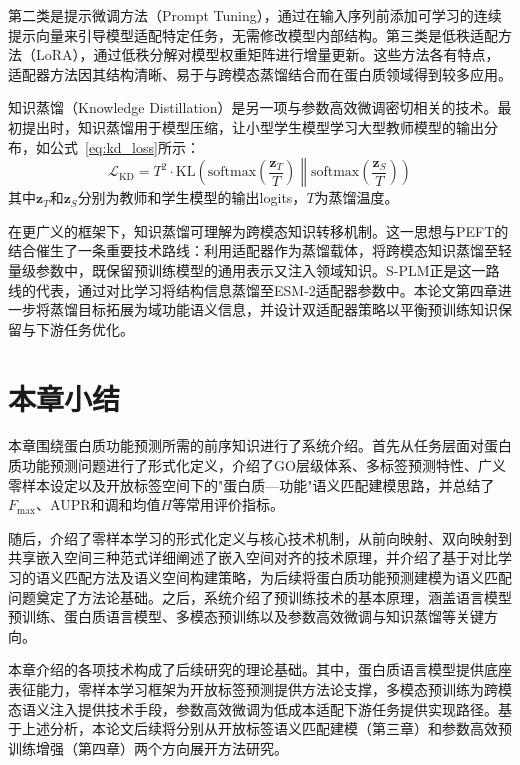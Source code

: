 第二类是提示微调方法（Prompt Tuning），通过在输入序列前添加可学习的连续提示向量来引导模型适配特定任务，无需修改模型内部结构。第三类是低秩适配方法（LoRA）\cite{hu2022lora}，通过低秩分解对模型权重矩阵进行增量更新。这些方法各有特点，适配器方法因其结构清晰、易于与跨模态蒸馏结合而在蛋白质领域得到较多应用。

知识蒸馏（Knowledge Distillation）\cite{hinton2015distilling}是另一项与参数高效微调密切相关的技术。最初提出时，知识蒸馏用于模型压缩，让小型学生模型学习大型教师模型的输出分布，如公式~\eqref{eq:kd_loss}所示：
\begin{equation}
\label{eq:kd_loss}
\mathcal{L}_{\text{KD}} = T^2 \cdot \text{KL}\left(\text{softmax}\left(\frac{\mathbf{z}_T}{T}\right) \middle\| \text{softmax}\left(\frac{\mathbf{z}_S}{T}\right)\right)
\end{equation}
其中$\mathbf{z}_T$和$\mathbf{z}_S$分别为教师和学生模型的输出logits，$T$为蒸馏温度。

在更广义的框架下，知识蒸馏可理解为跨模态知识转移机制。这一思想与PEFT的结合催生了一条重要技术路线：利用适配器作为蒸馏载体，将跨模态知识蒸馏至轻量级参数中，既保留预训练模型的通用表示又注入领域知识。S-PLM\cite{wang2025splm}正是这一路线的代表，通过对比学习将结构信息蒸馏至ESM-2适配器参数中。本论文第四章进一步将蒸馏目标拓展为域功能语义信息，并设计双适配器策略以平衡预训练知识保留与下游任务优化。

\section{本章小结}

本章围绕蛋白质功能预测所需的前序知识进行了系统介绍。首先从任务层面对蛋白质功能预测问题进行了形式化定义，介绍了GO层级体系、多标签预测特性、广义零样本设定以及开放标签空间下的"蛋白质—功能"语义匹配建模思路，并总结了$F_{\max}$、AUPR和调和均值$H$等常用评价指标。

随后，介绍了零样本学习的形式化定义与核心技术机制，从前向映射、双向映射到共享嵌入空间三种范式详细阐述了嵌入空间对齐的技术原理，并介绍了基于对比学习的语义匹配方法及语义空间构建策略，为后续将蛋白质功能预测建模为语义匹配问题奠定了方法论基础。之后，系统介绍了预训练技术的基本原理，涵盖语言模型预训练、蛋白质语言模型、多模态预训练以及参数高效微调与知识蒸馏等关键方向。

本章介绍的各项技术构成了后续研究的理论基础。其中，蛋白质语言模型提供底座表征能力，零样本学习框架为开放标签预测提供方法论支撑，多模态预训练为跨模态语义注入提供技术手段，参数高效微调为低成本适配下游任务提供实现路径。基于上述分析，本论文后续将分别从开放标签语义匹配建模（第三章）和参数高效预训练增强（第四章）两个方向展开方法研究。
